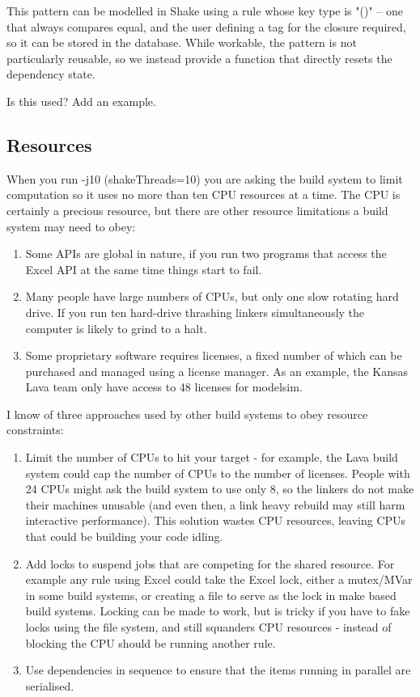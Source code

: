 This pattern can be modelled in Shake using a rule whose key type is \lst"()" -- one that always compares equal, and the user defining a tag for the closure required, so it can be stored in the database. While workable, the pattern is not particularly reusable, so we instead provide a function that directly resets the dependency state.

Is this used? Add an example.

\subsection{Resources}

When you run -j10 (shakeThreads=10) you are asking the build system to limit computation so it uses no more than ten CPU resources at a time. The CPU is certainly a precious resource, but there are other resource limitations a build system may need to obey:

\begin{enumerate}
\item Some APIs are global in nature, if you run two programs that access the Excel API at the same time things start to fail.
\item Many people have large numbers of CPUs, but only one slow rotating hard drive. If you run ten hard-drive thrashing linkers simultaneously the computer is likely to grind to a halt.
\item Some proprietary software requires licenses, a fixed number of which can be purchased and managed using a license manager. As an example, the Kansas Lava team only have access to 48 licenses for modelsim.
\end{enumerate}

I know of three approaches used by other build systems to obey resource constraints:

\begin{enumerate}
\item Limit the number of CPUs to hit your target - for example, the Lava build system could cap the number of CPUs to the number of licenses. People with 24 CPUs might ask the build system to use only 8, so the linkers do not make their machines unusable (and even then, a link heavy rebuild may still harm interactive performance). This solution wastes CPU resources, leaving CPUs that could be building your code idling.
\item Add locks to suspend jobs that are competing for the shared resource. For example any rule using Excel could take the Excel lock, either a mutex/MVar in some build systems, or creating a file to serve as the lock in make based build systems. Locking can be made to work, but is tricky if you have to fake locks using the file system, and still squanders CPU resources - instead of blocking the CPU should be running another rule.
\item Use dependencies in sequence to ensure that the items running in parallel are serialised.
\end{enumerate}

